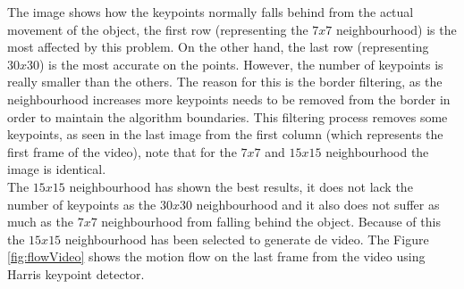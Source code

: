 \documentclass[12pt,a4paper]{article}
\begin{document}
The image shows how the keypoints normally falls behind from the actual movement of the object, the first row (representing the $7x7$ neighbourhood) is the most affected by this problem. On the other hand, the last row (representing $30x30$) is the most accurate on the points. However, the number of keypoints is really smaller than the others. The reason for this is the border filtering, as the neighbourhood increases more keypoints needs to be removed from the border in order to maintain the algorithm boundaries. This filtering process removes some keypoints, as seen in the last image from the first column (which represents the first frame of the video), note that for the $7x7$ and $15x15$ neighbourhood the image is identical. \\

The $15x15$ neighbourhood has shown the best results, it does not lack the number of keypoints as the $30x30$ neighbourhood and it also does not suffer as much as the $7x7$ neighbourhood from falling behind the object. Because of this the $15x15$ neighbourhood has been selected to generate de video. The Figure \ref{fig:flowVideo} shows the motion flow on the last frame from the video using Harris keypoint detector. \\
\end{document}
